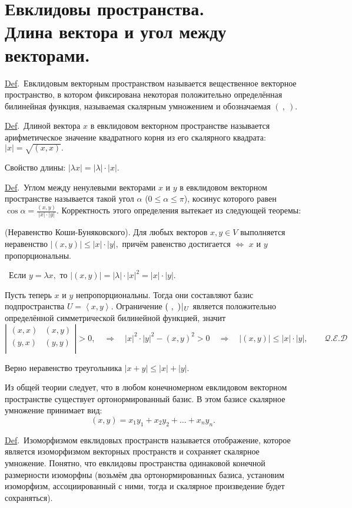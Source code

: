 \documentclass[a4paper]{article}%
\renewcommand{\de}{\par\noindent\underline{Def}.\ }%
\renewcommand{\ab}{\par\noindent}%
\newcommand{\dok}{\par\noindent{\textsl{Доказательство}.}\ }%
\newcommand{\lr}{\Leftrightarrow}%
\newcommand{\lob}[1]{\left\langle#1\right\rangle}%
\renewcommand{\le}{\leqslant}
\begin{document}
\section{Евклидовы пространства.\\ Длина вектора и угол между векторами.}
\label{q16} %
\de Евклидовым векторным пространством называется вещественное векторное пространство, в котором фиксирована
некоторая положительно определённая билинейная функция, называемая скалярным умножением и обозначаемая $(\ ,\
).$%
\de Длиной вектора $x$ в евклидовом векторном пространстве называется арифметическое значение квадратного корня из
его скалярного квадрата: $|x|=\sqrt{(x,x)}.$%
\ab Свойство длины: $|\lambda x|=|\lambda|\cdot|x|.$
%
\de Углом между ненулевыми векторами $x$ и $y$ в евклидовом векторном пространстве называется такой угол $\alpha$
($0\le\alpha\le\pi$), косинус которого равен $\cos\alpha=\frac{\displaystyle (x,y)}{\displaystyle |x|\cdot|y|}$.
Корректность этого определения вытекает из следующей теоремы:%
\ab{\bf Теорема} (Неравенство Коши-Буняковского). Для любых векторов $x,y\in V$ выполняется неравенство
$|(x,y)|\le|x|\cdot|y|,$ причём равенство достигается $\lr$ $x$ и $y$ пропорциональны.
\dok Если $y=\lambda x,$ то $|(x,y)|=|\lambda|\cdot|x|^2=|x|\cdot|y|.$%
\ab Пусть теперь $x$ и $y$ непропорциональны. Тогда они составляют базис подпространства $U=\lob{x,y}.$
Ограничение $(\ ,\ )\,\vrule\,_U$ является положительно определённой симметрической билинейной функцией, значит
$$
\left|%
\begin{array}{cc}
  (x,x) & (x,y) \\
  (y,x) & (y,y) \\
\end{array}%
\right|>0,\quad\Rightarrow\quad |x|^2\cdot|y|^2-(x,y)^2>0\quad\Rightarrow\quad
|(x,y)|\le|x|\cdot|y|,\qquad\mathcal{Q.E.D}
$$%
\ab Верно неравенство треугольника $|x+y|\le|x|+|y|.$%
\ab Из общей теории следует, что в любом конечномерном евклидовом векторном пространстве существует
ортонормированный базис. В этом базисе скалярное умножение принимает вид:
$$(x,y)=x_1y_1+x_2y_2+\dots+x_ny_n.$$
\de Изоморфизмом евклидовых пространств называется отображение, которое является изоморфизмом векторных
пространств и сохраняет скалярное умножение. Понятно, что евклидовы пространства одинаковой конечной размерности
изоморфны (возьмём два ортонормированных базиса, установим изоморфизм, ассоциированный с ними, тогда и
скалярное произведение будет сохраняться). %
\end{document}
